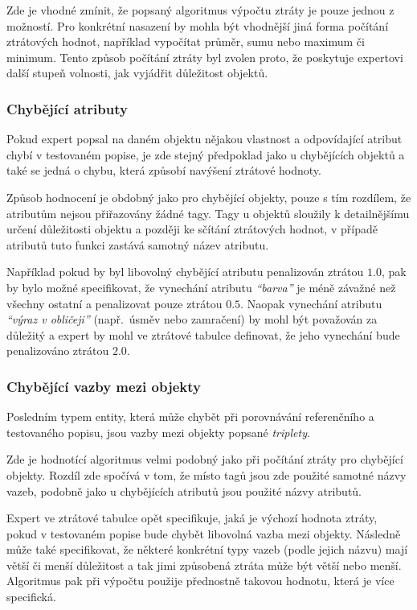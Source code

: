 Zde je vhodné zmínit, že popsaný algoritmus výpočtu ztráty je pouze jednou z možností.
Pro konkrétní nasazení by mohla být vhodnější jiná forma počítání ztrátových hodnot,
například vypočítat průměr, sumu nebo maximum či minimum.
Tento způsob počítání ztráty byl zvolen proto, že poskytuje expertovi další stupeň volnosti,
jak vyjádřit důležitost objektů.

\subsubsection{Chybějící atributy}
Pokud expert popsal na daném objektu nějakou vlastnost a odpovídající atribut chybí v testovaném popise,
je zde stejný předpoklad jako u chybějících objektů a také se jedná o chybu, která způsobí navýšení ztrátové hodnoty.

Způsob hodnocení je obdobný jako pro chybějící objekty, pouze s tím rozdílem, že atributům nejsou přiřazovány žádné tagy.
Tagy u objektů sloužily k detailnějšímu určení důležitosti objektu a později ke sčítání ztrátových hodnot,
v případě atributů tuto funkci zastává samotný název atributu.

Například pokud by byl libovolný chybějící atributu penalizován ztrátou $1.0$, pak by bylo možné
specifikovat, že vynechání atributu \emph{\enquote{barva}} je méně závažné než všechny ostatní a penalizovat pouze ztrátou $0.5$.
Naopak vynechání atributu \emph{\enquote{výraz v obličeji}} (např.~úsměv nebo zamračení) by mohl být považován za důležitý a expert by
mohl ve ztrátové tabulce definovat, že jeho vynechání bude penalizováno ztrátou $2.0$.

\subsubsection{Chybějící vazby mezi objekty}
Posledním typem entity, která může chybět při porovnávání referenčního a testovaného popisu, jsou vazby mezi objekty popsané \emph{triplety}.

Zde je hodnotící algoritmus velmi podobný jako při počítání ztráty pro chybějící objekty.
Rozdíl zde spočívá v tom, že místo tagů jsou zde použité samotné názvy vazeb, podobně jako u chybějících atributů jsou použité názvy atributů.

Expert ve ztrátové tabulce opět specifikuje, jaká je výchozí hodnota ztráty, pokud v testovaném popise bude chybět libovolná vazba mezi objekty.
Následně může také specifikovat, že některé konkrétní typy vazeb (podle jejich názvu) mají větší či menší důležitost a tak jimi způsobená ztráta může být větší nebo menší.
Algoritmus pak při výpočtu použije přednostně takovou hodnotu, která je více specifická.

